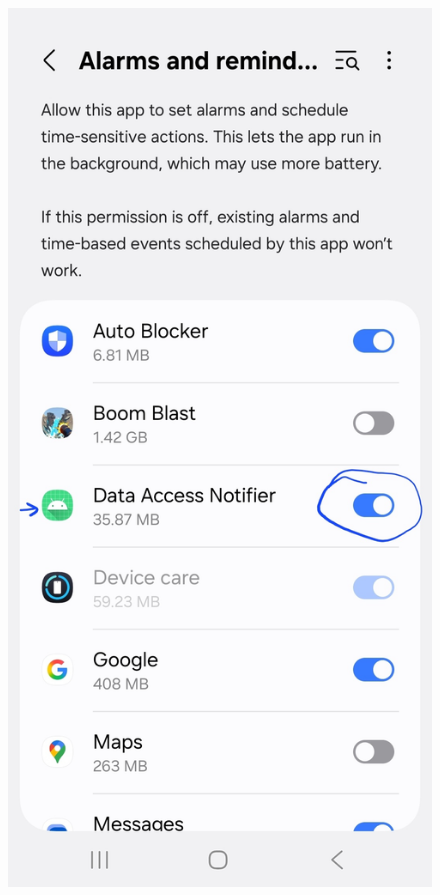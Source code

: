 \begin{figure}[H]
\begin{minipage}{0.32\textwidth}
    \includegraphics[width=\textwidth]{english/figures/Screenshot_20250812_212139_Settings.jpg}
\end{minipage}%
\hfill
\begin{minipage}{0.32\textwidth}

\end{minipage}
\end{figure}
